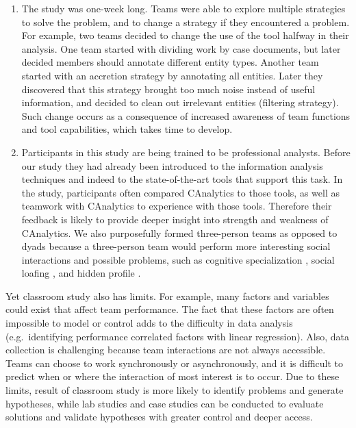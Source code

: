 \begin{enumerate}
	\def\labelenumi{\arabic{enumi}.}
	\item
	The study was one-week long. Teams were able to explore multiple
	strategies to solve the problem, and to change a strategy if they
	encountered a problem. For example, two teams decided to change the
	use of the tool halfway in their analysis. One team started with
	dividing work by case documents, but later decided members should
	annotate different entity types. Another team started with an
	accretion strategy by annotating all entities. Later they discovered
	that this strategy brought too much noise instead of useful
	information, and decided to clean out irrelevant entities (filtering
	strategy). Such change occurs as a consequence of increased awareness
	of team functions and tool capabilities, which takes time to develop.
	\item
	Participants in this study are being trained to be professional
	analysts. Before our study they had already been introduced to the
	information analysis techniques and indeed to the state-of-the-art
	tools that support this task. In the study, participants often
	compared CAnalytics to those tools, as well as teamwork with
	CAnalytics to experience with those tools. Therefore their feedback is
	likely to provide deeper insight into strength and weakness of
	CAnalytics. We also purposefully formed three-person teams as opposed
	to dyads because a three-person team would perform more interesting
	social interactions and possible problems, such as cognitive
	specialization \autocite{Borge2014}, social loafing
	\autocite{Karau1993}, and hidden profile \autocite{Stasser2003b}.
\end{enumerate}

Yet classroom study also has limits. For example, many factors and
variables could exist that affect team performance. The fact that these
factors are often impossible to model or control adds to the difficulty
in data analysis (e.g.~identifying performance correlated factors with
linear regression). Also, data collection is challenging because team
interactions are not always accessible. Teams can choose to work
synchronously or asynchronously, and it is difficult to predict when or
where the interaction of most interest is to occur. Due to these limits,
result of classroom study is more likely to identify problems and
generate hypotheses, while lab studies and case studies can be conducted
to evaluate solutions and validate hypotheses with greater control and
deeper access.

